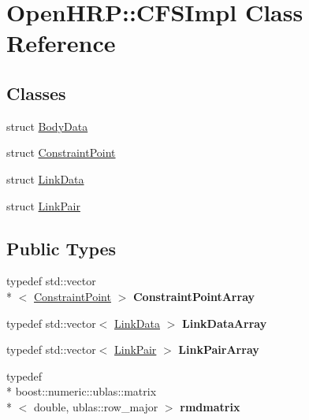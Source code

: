 \hypertarget{classOpenHRP_1_1CFSImpl}{\section{Open\-H\-R\-P\-:\-:C\-F\-S\-Impl Class Reference}
\label{classOpenHRP_1_1CFSImpl}
}
\subsection*{Classes}
\begin{DoxyCompactItemize}
\item 
struct \hyperlink{structOpenHRP_1_1CFSImpl_1_1BodyData}{Body\-Data}
\item 
struct \hyperlink{structOpenHRP_1_1CFSImpl_1_1ConstraintPoint}{Constraint\-Point}
\item 
struct \hyperlink{structOpenHRP_1_1CFSImpl_1_1LinkData}{Link\-Data}
\item 
struct \hyperlink{structOpenHRP_1_1CFSImpl_1_1LinkPair}{Link\-Pair}
\end{DoxyCompactItemize}
\subsection*{Public Types}
\begin{DoxyCompactItemize}
\item 
\hypertarget{classOpenHRP_1_1CFSImpl_afff7f75d434773026a8db8ada591193e}{typedef std\-::vector\\*
$<$ \hyperlink{structOpenHRP_1_1CFSImpl_1_1ConstraintPoint}{Constraint\-Point} $>$ {\bfseries Constraint\-Point\-Array}}\label{classOpenHRP_1_1CFSImpl_afff7f75d434773026a8db8ada591193e}

\item 
\hypertarget{classOpenHRP_1_1CFSImpl_aafc6272b021a652ba846232b9681e23a}{typedef std\-::vector$<$ \hyperlink{structOpenHRP_1_1CFSImpl_1_1LinkData}{Link\-Data} $>$ {\bfseries Link\-Data\-Array}}\label{classOpenHRP_1_1CFSImpl_aafc6272b021a652ba846232b9681e23a}

\item 
\hypertarget{classOpenHRP_1_1CFSImpl_a260b7d7a80133ce22715457cfd5ea935}{typedef std\-::vector$<$ \hyperlink{structOpenHRP_1_1CFSImpl_1_1LinkPair}{Link\-Pair} $>$ {\bfseries Link\-Pair\-Array}}\label{classOpenHRP_1_1CFSImpl_a260b7d7a80133ce22715457cfd5ea935}

\item 
\hypertarget{classOpenHRP_1_1CFSImpl_afeb05336eea3df6fe7266edf92898d3d}{typedef \\*
boost\-::numeric\-::ublas\-::matrix\\*
$<$ double, ublas\-::row\-\_\-major $>$ {\bfseries rmdmatrix}}\label{classOpenHRP_1_1CFSImpl_afeb05336eea3df6fe7266edf92898d3d}

\end{DoxyCompactItemize}
